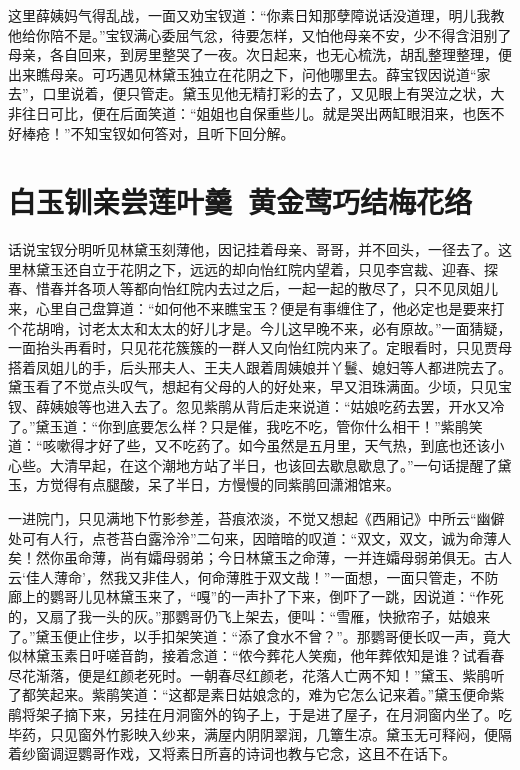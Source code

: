 \documentclass[12pt,oneside]{book}
\begin{document}
这里薛姨妈气得乱战，一面又劝宝钗道：“你素日知那孽障说话没道理，明儿我教他给你陪不是。”宝钗满心委屈气忿，待要怎样，又怕他母亲不安，少不得含泪别了母亲，各自回来，到房里整哭了一夜。次日起来，也无心梳洗，胡乱整理整理，便出来瞧母亲。可巧遇见林黛玉独立在花阴之下，问他哪里去。薛宝钗因说道“家去”，口里说着，便只管走。黛玉见他无精打彩的去了，又见眼上有哭泣之状，大非往日可比，便在后面笑道：“姐姐也自保重些儿。就是哭出两缸眼泪来，也医不好棒疮！”不知宝钗如何答对，且听下回分解。



 
\chapter{白玉钏亲尝莲叶羹~黄金莺巧结梅花络}
话说宝钗分明听见林黛玉刻薄他，因记挂着母亲、哥哥，并不回头，一径去了。这里林黛玉还自立于花阴之下，远远的却向怡红院内望着，只见李宫裁、迎春、探春、惜春并各项人等都向怡红院内去过之后，一起一起的散尽了，只不见凤姐儿来，心里自己盘算道：“如何他不来瞧宝玉？便是有事缠住了，他必定也是要来打个花胡哨，讨老太太和太太的好儿才是。今儿这早晚不来，必有原故。”一面猜疑，一面抬头再看时，只见花花簇簇的一群人又向怡红院内来了。定眼看时，只见贾母搭着凤姐儿的手，后头邢夫人、王夫人跟着周姨娘并丫鬟、媳妇等人都进院去了。黛玉看了不觉点头叹气，想起有父母的人的好处来，早又泪珠满面。少顷，只见宝钗、薛姨娘等也进入去了。忽见紫鹃从背后走来说道：“姑娘吃药去罢，开水又冷了。”黛玉道：“你到底要怎么样？只是催，我吃不吃，管你什么相干！”紫鹃笑道：“咳嗽得才好了些，又不吃药了。如今虽然是五月里，天气热，到底也还该小心些。大清早起，在这个潮地方站了半日，也该回去歇息歇息了。”一句话提醒了黛玉，方觉得有点腿酸，呆了半日，方慢慢的同紫鹃回潇湘馆来。

一进院门，只见满地下竹影参差，苔痕浓淡，不觉又想起《西厢记》中所云“幽僻处可有人行，点苍苔白露泠泠”二句来，因暗暗的叹道：“双文，双文，诚为命薄人矣！然你虽命薄，尚有孀母弱弟；今日林黛玉之命薄，一并连孀母弱弟俱无。古人云‘佳人薄命’，然我又非佳人，何命薄胜于双文哉！”一面想，一面只管走，不防廊上的鹦哥儿见林黛玉来了，“嘎”的一声扑了下来，倒吓了一跳，因说道：“作死的，又扇了我一头的灰。”那鹦哥仍飞上架去，便叫：“雪雁，快掀帘子，姑娘来了。”黛玉便止住步，以手扣架笑道：“添了食水不曾？”。那鹦哥便长叹一声，竟大似林黛玉素日吁嗟音韵，接着念道：“侬今葬花人笑痴，他年葬侬知是谁？试看春尽花渐落，便是红颜老死时。一朝春尽红颜老，花落人亡两不知！”黛玉、紫鹃听了都笑起来。紫鹃笑道：“这都是素日姑娘念的，难为它怎么记来着。”黛玉便命紫鹃将架子摘下来，另挂在月洞窗外的钩子上，于是进了屋子，在月洞窗内坐了。吃毕药，只见窗外竹影映入纱来，满屋内阴阴翠润，几簟生凉。黛玉无可释闷，便隔着纱窗调逗鹦哥作戏，又将素日所喜的诗词也教与它念，这且不在话下。
\end{document}
